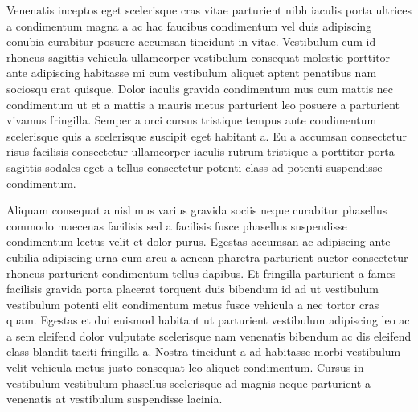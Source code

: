 \par
Venenatis inceptos eget scelerisque cras vitae parturient nibh iaculis porta ultrices a condimentum magna a ac hac faucibus condimentum vel duis adipiscing conubia curabitur posuere accumsan tincidunt in vitae. Vestibulum cum id rhoncus sagittis vehicula ullamcorper vestibulum consequat molestie porttitor ante adipiscing habitasse mi cum vestibulum aliquet aptent penatibus nam sociosqu erat quisque. Dolor iaculis gravida condimentum mus cum mattis nec condimentum ut et a mattis a mauris metus parturient leo posuere a parturient vivamus fringilla. Semper a orci cursus tristique tempus ante condimentum scelerisque quis a scelerisque suscipit eget habitant a. Eu a accumsan consectetur risus facilisis consectetur ullamcorper iaculis rutrum tristique a porttitor porta sagittis sodales eget a tellus consectetur potenti class ad potenti suspendisse condimentum.
\par
Aliquam consequat a nisl mus varius gravida sociis neque curabitur phasellus commodo maecenas facilisis sed a facilisis fusce phasellus suspendisse condimentum lectus velit et dolor purus. Egestas accumsan ac adipiscing ante cubilia adipiscing urna cum arcu a aenean pharetra parturient auctor consectetur rhoncus parturient condimentum tellus dapibus. Et fringilla parturient a fames facilisis gravida porta placerat torquent duis bibendum id ad ut vestibulum vestibulum potenti elit condimentum metus fusce vehicula a nec tortor cras quam. Egestas et dui euismod habitant ut parturient vestibulum adipiscing leo ac a sem eleifend dolor vulputate scelerisque nam venenatis bibendum ac dis eleifend class blandit taciti fringilla a. Nostra tincidunt a ad habitasse morbi vestibulum velit vehicula metus justo consequat leo aliquet condimentum. Cursus in vestibulum vestibulum phasellus scelerisque ad magnis neque parturient a venenatis at vestibulum suspendisse lacinia. 


